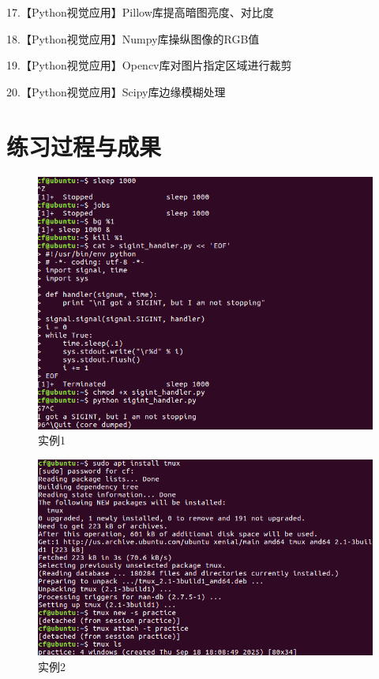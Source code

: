 \documentclass[cn,12pt]{report}
\begin{document}
  17.【Python视觉应用】Pillow库提高暗图亮度、对比度

  18.【Python视觉应用】Numpy库操纵图像的RGB值

  19.【Python视觉应用】Opencv库对图片指定区域进行裁剪

  20.【Python视觉应用】Scipy库边缘模糊处理

  

  



\section{练习过程与成果}
{
  \begin{figure}[htbp]
    \centering
    \includegraphics[width=1\textwidth]{image/1.png}
    \caption{实例1}
  \end{figure}
\FloatBarrier
   
  \begin{figure}[htbp]
    \centering
    \includegraphics[width=1\textwidth]{image/2.png}
    \caption{实例2}
  \end{figure}
\FloatBarrier
   
}
\end{document}
